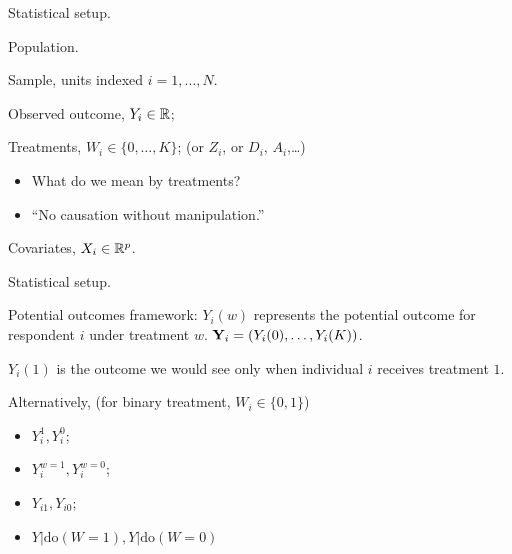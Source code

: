 \documentclass[xcolor={dvipsnames}, handout]{beamer}
\begin{document}
\begin{frame}{Statistical setup.}

\begin{wideitemize}
\item Population. \pause
\item Sample, units indexed $i = 1, \dots, N$.\pause
\item Observed outcome, $Y_i\in {\mathbb R}$;\pause
\item Treatments, $W_i \in \{0, \dots, K\}$; \pause (or $Z_i$, or $D_i$, $A_i$,\dots)\pause
\begin{itemize}
\item What do we mean by treatments? \pause
\item ``No causation without manipulation.'' \citep{holland1986}\pause
\end{itemize}
\item Covariates, $X_i \in {\mathbb R}^p$.
\end{wideitemize}

\end{frame}



\begin{frame}{Statistical setup.}

\begin{wideitemize}
\item Potential outcomes framework: $Y_i(w)$ represents the potential outcome for respondent $i$ under treatment $w$. \pause $\mathbf{Y}_i = (Y_i(0), \dots, Y_i(K))$.\pause
\item $Y_i(1)$ is the outcome we would see only when individual $i$ receives treatment $1$. \pause
\item Alternatively, (for binary treatment, $W_i \in\{0,1\}$) 
\begin{itemize}
\item $Y_i^1, Y_i^0$; 
\item $Y_i^{w=1},Y_i^{w=0}$; 
\item $Y_{i1}, Y_{i0}$; 
\item $Y|\textrm{do}(W = 1), Y|\textrm{do}(W = 0)$
\end{itemize}
\end{wideitemize}

\end{frame}
\end{document}
